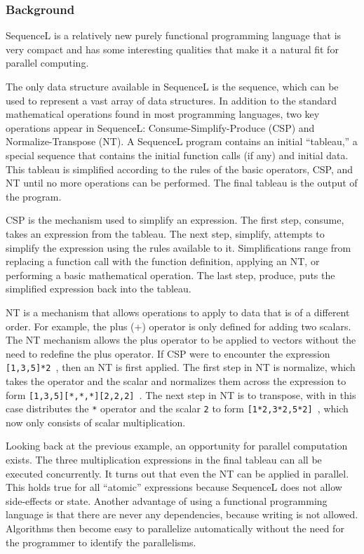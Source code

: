 \subsubsection{Background}\label{sec:conclusions:future_work:sequencel:background}

SequenceL is a relatively new purely functional programming language that is very compact and has some interesting qualities that make it a natural fit for parallel computing.

The only data structure available in SequenceL is the sequence, which can be used to represent a vast array of data structures. In addition to the standard mathematical operations found in most programming languages, two key operations appear in SequenceL: Consume-Simplify-Produce (CSP) and Normalize-Transpose (NT). A SequenceL program contains an initial ``tableau,'' a special sequence that contains the initial function calls (if any) and initial data. This tableau is simplified according to the rules of the basic operators, CSP, and NT until no more operations can be performed. The final tableau is the output of the program. \cite{ref:2005-cooke-sequencel_overview}

CSP is the mechanism used to simplify an expression. The first step, consume, takes an expression from the tableau. The next step, simplify, attempts to simplify the expression using the rules available to it. Simplifications range from replacing a function call with the function definition, applying an NT, or performing a basic mathematical operation. The last step, produce, puts the simplified expression back into the tableau. \cite{ref:2005-cooke-sequencel_overview}

NT is a mechanism that allows operations to apply to data that is of a different order. For example, the plus (+) operator is only defined for adding two scalars. The NT mechanism allows the plus operator to be applied to vectors without the need to redefine the plus operator. If CSP were to encounter the expression \lstinline$[1,3,5]*2 $, then an NT is first applied. The first step in NT is normalize, which takes the  operator and the scalar  and normalizes them across the expression to form \lstinline$[1,3,5][*,*,*][2,2,2] $. The next step in NT is to transpose, with in this case distributes the \lstinline$*$ operator and the scalar \lstinline$2$ to form \lstinline$[1*2,3*2,5*2] $, which now only consists of scalar multiplication. \cite{ref:2005-cooke-sequencel_overview}

Looking back at the previous example, an opportunity for parallel computation exists. The three multiplication expressions in the final tableau can all be executed concurrently. It turns out that even the NT can be applied in parallel. This holds true for all ``atomic'' expressions because SequenceL does not allow side-effects or state. Another advantage of using a functional programming language is that there are never any dependencies, because writing is not allowed. Algorithms then become easy to parallelize automatically without the need for the programmer to identify the parallelisms. 

